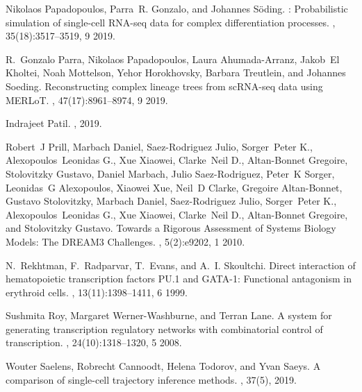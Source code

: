 \documentclass[10pt, a4paper]{article}
\begin{document}
\begin{thebibliography}{10}
	Nikolaos Papadopoulos, Parra~R. Gonzalo, and Johannes S{\"o}ding.
	: Probabilistic simulation of single-cell {{RNA}}-seq data
	for complex differentiation processes.
	, 35(18):3517--3519, 9 2019.
	
	R.~Gonzalo Parra, Nikolaos Papadopoulos, Laura Ahumada-Arranz, Jakob~El
	Kholtei, Noah Mottelson, Yehor Horokhovsky, Barbara Treutlein, and Johannes
	Soeding.
	\newblock Reconstructing complex lineage trees from {{scRNA}}-seq data using
	{{MERLoT}}.
	, 47(17):8961--8974, 9 2019.
	
	Indrajeet Patil.
	, 2019.
	
	Robert~J Prill, Marbach Daniel, Saez-Rodriguez Julio, Sorger~Peter K.,
	Alexopoulos~Leonidas G., Xue Xiaowei, Clarke~Neil D., Altan-Bonnet Gregoire,
	Stolovitzky Gustavo, Daniel Marbach, Julio Saez-Rodriguez, Peter~K Sorger,
	Leonidas~G Alexopoulos, Xiaowei Xue, Neil~D Clarke, Gregoire Altan-Bonnet,
	Gustavo Stolovitzky, Marbach Daniel, Saez-Rodriguez Julio, Sorger~Peter K.,
	Alexopoulos~Leonidas G., Xue Xiaowei, Clarke~Neil D., Altan-Bonnet Gregoire,
	and Stolovitzky Gustavo.
	\newblock Towards a {{Rigorous Assessment}} of {{Systems Biology Models}}:
	{{The DREAM3 Challenges}}.
	, 5(2):e9202, 1 2010.
	
	N.~Rekhtman, F.~Radparvar, T.~Evans, and A.~I. Skoultchi.
	\newblock Direct interaction of hematopoietic transcription factors {{PU}}.1
	and {{GATA}}-1: Functional antagonism in erythroid cells.
	, 13(11):1398--1411, 6 1999.
	
	Sushmita Roy, Margaret Werner-Washburne, and Terran Lane.
	\newblock A system for generating transcription regulatory networks with
	combinatorial control of transcription.
	, 24(10):1318--1320, 5 2008.
	
	Wouter Saelens, Robrecht Cannoodt, Helena Todorov, and Yvan Saeys.
	\newblock A comparison of single-cell trajectory inference methods.
	, 37(5), 2019.
	

\end{thebibliography}
\end{document}
